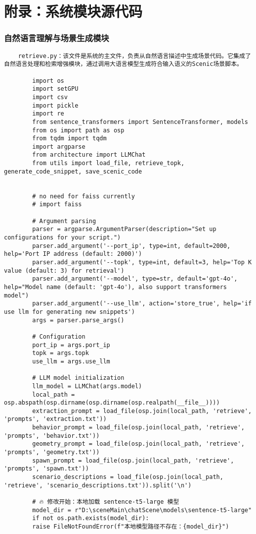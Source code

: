 \chapter{附录：系统模块源代码}

\subsection*{自然语言理解与场景生成模块}
\begin{lstlisting}
	retrieve.py：该文件是系统的主文件，负责从自然语言描述中生成场景代码。它集成了自然语言处理和检索增强模块，通过调用大语言模型生成符合输入语义的Scenic场景脚本。

		import os
		import setGPU
		import csv
		import pickle
		import re
		from sentence_transformers import SentenceTransformer, models
		from os import path as osp
		from tqdm import tqdm
		import argparse
		from architecture import LLMChat
		from utils import load_file, retrieve_topk, generate_code_snippet, save_scenic_code
		
		
		# no need for faiss currently
		# import faiss
		
		# Argument parsing
		parser = argparse.ArgumentParser(description="Set up configurations for your script.")
		parser.add_argument('--port_ip', type=int, default=2000, help='Port IP address (default: 2000)')
		parser.add_argument('--topk', type=int, default=3, help='Top K value (default: 3) for retrieval')
		parser.add_argument('--model', type=str, default='gpt-4o', help="Model name (default: 'gpt-4o'), also support transformers model")
		parser.add_argument('--use_llm', action='store_true', help='if use llm for generating new snippets')
		args = parser.parse_args()
		
		# Configuration
		port_ip = args.port_ip
		topk = args.topk
		use_llm = args.use_llm
		
		# LLM model initialization
		llm_model = LLMChat(args.model)
		local_path = osp.abspath(osp.dirname(osp.dirname(osp.realpath(__file__))))
		extraction_prompt = load_file(osp.join(local_path, 'retrieve', 'prompts', 'extraction.txt'))
		behavior_prompt = load_file(osp.join(local_path, 'retrieve', 'prompts', 'behavior.txt'))
		geometry_prompt = load_file(osp.join(local_path, 'retrieve', 'prompts', 'geometry.txt'))
		spawn_prompt = load_file(osp.join(local_path, 'retrieve', 'prompts', 'spawn.txt'))
		scenario_descriptions = load_file(osp.join(local_path, 'retrieve', 'scenario_descriptions.txt')).split('\n')
		
		# 🔥 修改开始：本地加载 sentence-t5-large 模型
		model_dir = r"D:\sceneMain\chatScene\models\sentence-t5-large"
		if not os.path.exists(model_dir):
		raise FileNotFoundError(f"本地模型路径不存在：{model_dir}")
		

\end{lstlisting}
